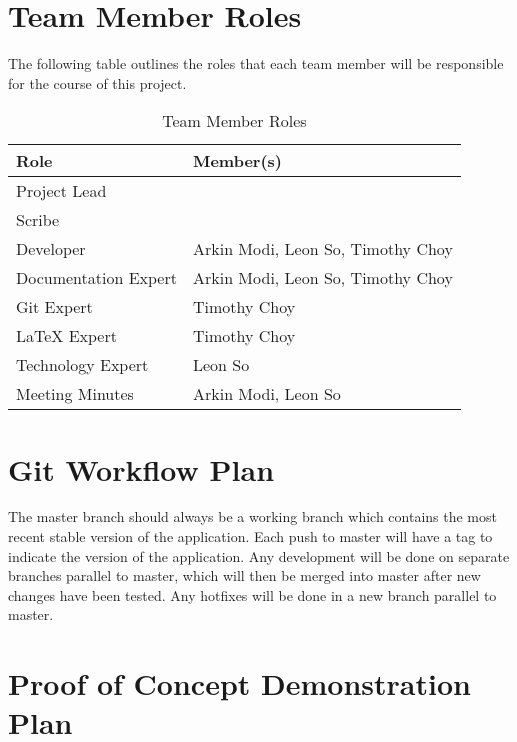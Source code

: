 \documentclass{article}
\begin{document}
\section{Team Member Roles}
The following table outlines the roles that each team member will be responsible for the course of this project.

\begin{table}
    \centering
    \begin{tabular}{|l|l|}
        \hline
        \textbf{Role} & \textbf{Member(s)} \\
        \hline
        Project Lead & \\
        \hline
        Scribe & \\
        \hline
        Developer & Arkin Modi, Leon So, Timothy Choy \\
        \hline
        Documentation Expert & Arkin Modi, Leon So, Timothy Choy \\
        \hline
        Git Expert & Timothy Choy \\
        \hline
        LaTeX Expert & Timothy Choy \\
        \hline
        Technology Expert & Leon So \\
        \hline
        Meeting Minutes & Arkin Modi, Leon So \\
        \hline
    \end{tabular}
    \caption{Team Member Roles}
\end{table}


\section{Git Workflow Plan}
The master branch should always be a working branch which contains the most recent stable version of the application. Each push to master will have a tag to indicate the version of the application. Any development will be done on separate branches parallel to master, which will then be merged into master after new changes have been tested. Any hotfixes will be done in a new branch parallel to master.

\section{Proof of Concept Demonstration Plan}
\end{document}
